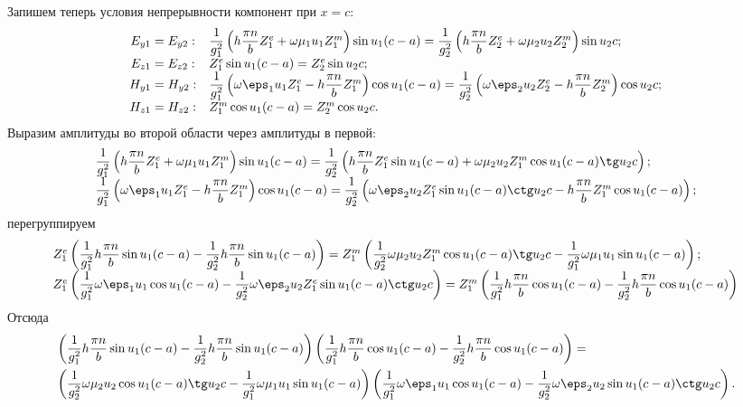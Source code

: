 \documentclass[a4paper]{article}
\renewcommand{\frac}{\dfrac}
\begin{document}
Запишем теперь условия непрерывности компонент при \( x = c \):
\[
\begin{array}{cl}
    E_{y1} = E_{y2}: &
    \frac{1}{g_1^2} \left(h \frac{\pi n}{b} Z^e_1 + \omega\mu_1u_1Z^m_1\right)
    \sin u_1 (c-a) =  \frac{1}{g_2^2}
    \left(h \frac{\pi n}{b} Z^e_2 + \omega\mu_2u_2Z^m_2\right)
    \sin u_2 c ;\\
    E_{z1} = E_{z2}: & Z^e_1\sin u_1 (c-a) = Z^e_2\sin u_2 c; \\
    H_{y1} = H_{y2}: &
    \frac{1}{g_1^2}\left(\omega\eps_1u_1Z^e_1-h \frac{\pi n}{b} Z^m_1\right)
    \cos u_1 (c-a) = \frac{1}{g_2^2}
    \left(\omega\eps_2u_2Z^e_2-h \frac{\pi n}{b} Z^m_2\right)\cos u_2 c ;\\
    H_{z1} = H_{z2}: & Z^m_1\cos u_1 (c-a) = Z^m_2\cos u_2 c.\\
\end{array}
\]
Выразим амплитуды во второй области через амплитуды в первой:
\[
\begin{array}{l}
    \frac{1}{g_1^2} \left(h \frac{\pi n}{b} Z^e_1 + \omega\mu_1u_1Z^m_1\right)
    \sin u_1 (c-a) =  \frac{1}{g_2^2}
    \left(h \frac{\pi n}{b} Z^e_1 \sin u_1(c-a) +
    \omega\mu_2u_2Z^m_1\cos u_1 (c-a) \tg u_2 c \right) ;\\
    \frac{1}{g_1^2}\left(\omega\eps_1u_1Z^e_1-h \frac{\pi n}{b} Z^m_1\right)
    \cos u_1 (c-a) = \frac{1}{g_2^2}
    \left(\omega\eps_2u_2Z^e_1\sin u_1(c-a)\ctg u_2 c-
    h \frac{\pi n}{b} Z^m_1\cos u_1 (c-a)\right) ;\\
\end{array}
\]
перегруппируем
\[
\begin{array}{l}
    Z^e_1\left(\frac{1}{g_1^2} h \frac{\pi n}{b}\sin u_1 (c-a) -
    \frac{1}{g_2^2}h \frac{\pi n}{b}\sin u_1(c-a)\right) =
    Z^m_1\left(\frac{1}{g_2^2}\omega\mu_2u_2Z^m_1\cos u_1 (c-a) \tg u_2 c-
    \frac{1}{g_1^2}\omega\mu_1u_1\sin u_1 (c-a)\right);\\
    Z^e_1\left(\frac{1}{g_1^2}\omega\eps_1u_1\cos u_1 (c-a)-
    \frac{1}{g_2^2}\omega\eps_2u_2Z^e_1\sin u_1(c-a)\ctg u_2 c\right)=
    Z^m_1\left(\frac{1}{g_1^2}h \frac{\pi n}{b} \cos u_1 (c-a)-
    \frac{1}{g_2^2}h \frac{\pi n}{b} \cos u_1 (c-a)\right)
\end{array}
\]
Отсюда
\begin{align*}
    &\left(\frac{1}{g_1^2} h \frac{\pi n}{b}\sin u_1 (c-a) -
    \frac{1}{g_2^2}h \frac{\pi n}{b}\sin u_1(c-a)\right)\left(\frac{1}{g_1^2}h \frac{\pi n}{b} \cos u_1 (c-a)-
    \frac{1}{g_2^2}h \frac{\pi n}{b} \cos u_1 (c-a)\right) =\\
    & \left(\frac{1}{g_2^2}\omega\mu_2u_2\cos u_1 (c-a) \tg u_2 c-
    \frac{1}{g_1^2}\omega\mu_1u_1\sin u_1 (c-a)\right)
    \left(\frac{1}{g_1^2}\omega\eps_1u_1\cos u_1 (c-a)-
    \frac{1}{g_2^2}\omega\eps_2u_2\sin u_1(c-a)\ctg u_2 c\right).
\end{align*}
\end{document}
